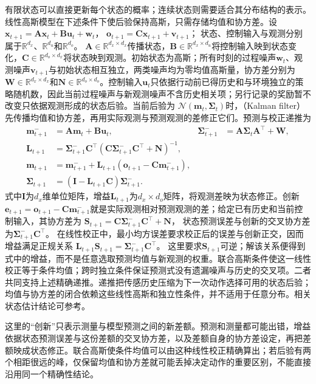 有限状态可以直接更新每个状态的概率；连续状态则需要适合其分布结构的表示。线性高斯模型在下述条件下使后验保持高斯，只需存储均值和协方差。设
$\bm x_{t+1}=\bm A\bm x_t+\bm B\bm u_t+\bm w_t$，
$\bm o_{t+1}=\bm C\bm x_{t+1}+\bm v_{t+1}$；
状态、控制输入与观测分别属于$\mathbb R^{d_x}$、$\mathbb R^{d_u}$和$\mathbb R^{d_o}$。
$\bm A\in\mathbb R^{d_x\times d_x}$传播状态，$\bm B\in\mathbb R^{d_x\times d_u}$将控制输入映到状态变化，$\bm C\in\mathbb R^{d_o\times d_x}$将状态映到观测。初始状态为高斯；所有时刻的过程噪声$\bm w_t$、观测噪声$\bm v_{t+1}$与初始状态相互独立，两类噪声均为零均值高斯量，协方差分别为$\bm W\in\mathbb R^{d_x\times d_x}$和$\bm N\in\mathbb R^{d_o\times d_o}$。控制输入$\bm u_t$只依据行动前已得历史和与环境独立的策略随机数，因此当前过程噪声与新观测噪声不含历史相关项；另行记录的奖励暂不改变只依据观测形成的状态后验。当前后验为
$\mathcal N(\bm m_t,\bm\Sigma_t)$时，（Kalman filter）先传播均值和协方差，再用实际观测与预测观测的差修正它们。预测与校正递推为
\begin{align}
  \label{eq:rl-information-kalman}
  \bm m^-_{t+1}&=\bm A\bm m_t+\bm B\bm u_t,&
  \bm\Sigma^-_{t+1}&=\bm A\bm\Sigma_t\bm A^\top+\bm W,\nonumber\\
  \bm L_{t+1}&=\bm\Sigma^-_{t+1}\bm C^\top
     (\bm C\bm\Sigma^-_{t+1}\bm C^\top+\bm N)^{-1},\nonumber\\
  \bm m_{t+1}&=\bm m^-_{t+1}
       +\bm L_{t+1}(\bm o_{t+1}-\bm C\bm m^-_{t+1}),\nonumber\\
  \bm\Sigma_{t+1}&=(\bm I-\bm L_{t+1}\bm C)\bm\Sigma^-_{t+1}.
\end{align}
式中$\bm I$为$d_x$维单位矩阵，增益$\bm L_{t+1}$为$d_x\times d_o$矩阵，将观测差映为状态修正。创新$\bm e_{t+1}=\bm o_{t+1}-\bm C\bm m^-_{t+1}$就是实际观测相对预测观测的差；给定已有历史和当前控制输入，其协方差为
$\bm S_{t+1}=\bm C\bm\Sigma^-_{t+1}\bm C^\top+\bm N$，
状态预测误差与创新的交叉协方差为$\bm\Sigma^-_{t+1}\bm C^\top$。
在线性校正中，最小均方误差要求校正后的误差与创新正交，因而增益满足正规关系
$\bm L_{t+1}\bm S_{t+1}=\bm\Sigma^-_{t+1}\bm C^\top$。
这里要求$\bm S_{t+1}$可逆；解该关系便得到式中的增益，而不是任意选取预测均值与新观测的权重。联合高斯条件使这一线性校正等于条件均值；跨时独立条件保证预测式没有遗漏噪声与历史的交叉项。二者共同支持上述精确递推。递推把传感历史压缩为下一次动作选择可用的状态后验；均值与协方差的闭合依赖这些线性高斯和独立性条件，并不适用于任意分布。相关状态估计结论可参考。

这里的“创新”只表示测量与模型预测之间的新差额。预测和测量都可能出错，增益依据状态预测误差与这份差额的交叉协方差，以及差额自身的协方差设定，再把差额映成状态修正。联合高斯使条件均值可以由这种线性校正精确算出；若后验有两个相距很远的峰，仅保留均值和协方差就可能丢掉决定动作的重要区别，不能直接沿用同一个精确性结论。

